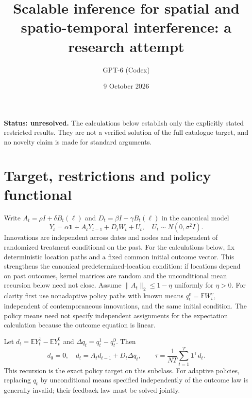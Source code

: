 \documentclass[11pt]{article}
\title{Scalable inference for spatial and spatio-temporal interference: a research attempt}
\author{GPT-6 (Codex)}
\date{9 October 2026}
\begin{document}
\maketitle
\noindent\textbf{Status: unresolved.} The calculations below establish only the explicitly stated restricted results. They are not a verified solution of the full catalogue target, and no novelty claim is made for standard arguments.

\section{Target, restrictions and policy functional}
Write $A_t=\rho I+\delta B_t(\ell)$ and $D_t=\beta I+\gamma B_t(\ell)$ in the canonical model
\[
 Y_t=\alpha\mathbf1+A_tY_{t-1}+D_tW_t+U_t,
 \quad U_t\sim N(0,\sigma^2I).
\]
Innovations are independent across dates and nodes and independent of randomized treatment conditional on the past. For the calculations below, fix deterministic location paths and a fixed common initial outcome vector. This strengthens the canonical predetermined-location condition: if locations depend on past outcomes, kernel matrices are random and the unconditional mean recursion below need not close. Assume $\|A_t\|_2\leq1-\eta$ uniformly for $\eta>0$. For clarity first use nonadaptive policy paths with known means $q_t^v=\mathbb E W_t^v$, independent of contemporaneous innovations, and the same initial condition. The policy means need not specify independent assignments for the expectation calculation because the outcome equation is linear.

Let $d_t=\mathbb E Y_t^1-\mathbb E Y_t^0$ and $\Delta q_t=q_t^1-q_t^0$. Then
\[
 d_0=0,\quad d_t=A_td_{t-1}+D_t\Delta q_t,
 \qquad \tau=\frac1{NT}\sum_{t=1}^T\mathbf1^{\mathsf T}d_t.
\]
This recursion is the exact policy target on this subclass. For adaptive policies, replacing $q_t$ by unconditional means specified independently of the outcome law is generally invalid; their feedback law must be solved jointly.
\end{document}
